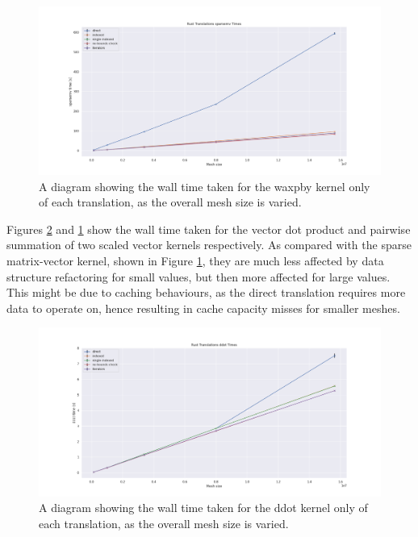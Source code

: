 \begin{figure}[H]
    \centering
    \includegraphics[width=\textwidth]{images/3_translation/performance/translations_sparsemv_line.png}
    \caption{A diagram showing the wall time taken for the waxpby kernel only of each translation, as the overall mesh size is varied.}
    \label{fig:translations_waxpby_line}
\end{figure}

Figures \ref{fig:translations_ddot_line} and \ref{fig:translations_waxpby_line} show the wall time taken for the vector dot product and pairwise summation of two scaled vector kernels respectively. As compared with the sparse matrix-vector kernel, shown in Figure \ref{fig:translations_waxpby_line}, they are much less affected by data structure refactoring for small values, but then more affected for large values. This might be due to caching behaviours, as the direct translation requires more data to operate on, hence resulting in cache capacity misses for smaller meshes.

\begin{figure}[H]
    \centering
    \includegraphics[width=\textwidth]{images/3_translation/performance/translations_ddot_line.png}
    \caption{A diagram showing the wall time taken for the ddot kernel only of each translation, as the overall mesh size is varied.}
    \label{fig:translations_ddot_line}
\end{figure}

